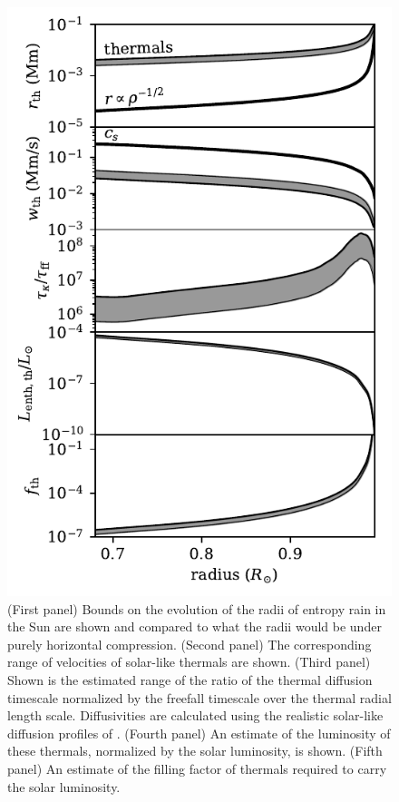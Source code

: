 \begin{figure}[p!]
    \includegraphics[width=\columnwidth]{./figs/thermal_sun_comparison.pdf}
    \caption[Implications of thermal experiment results for solar convection and the entropy rain hypothesis]
	{
	(First panel) Bounds on the evolution of the radii of entropy rain in the Sun are shown and compared to what the radii would be under purely horizontal compression.
	(Second panel) The corresponding range of velocities of solar-like thermals are shown. 
	(Third panel) Shown is the estimated range of the ratio of the thermal diffusion timescale normalized by the freefall timescale over the thermal radial length scale.
	Diffusivities are calculated using the realistic solar-like diffusion profiles of \cite{brown2011}.
	(Fourth panel) An estimate of the luminosity of these thermals, normalized by the solar luminosity, is shown.
	(Fifth panel) An estimate of the filling factor of thermals required to carry the solar luminosity.
    \label{fig:thermal_sun_comparison} }
\end{figure}


